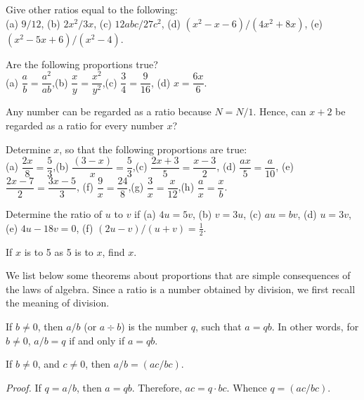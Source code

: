 \documentclass[11pt]{book}
\begin{document}
\begin{exercisecols}
\begin{exlist}
\item Give other ratios equal to the following:\\
      (a) $9/12$, (b) $2x^2/3x$, (c) $12abc/27c^2$, (d) $(x^2-x-6)/(4x^2+8x)$,
      (e) $(x^2-5x+6)/(x^2-4)$.
\item Are the following proportions true?\\
      (a) $\dfrac{a}{b} = \dfrac{a^2}{ab}$,\quad (b) $\dfrac{x}{y} =
      \dfrac{x^2}{y^2}$,\quad (c) $\dfrac{3}{4} = \dfrac{9}{16}$,\quad
      (d) $x = \dfrac{6x}{6}$.
\item Any number can be regarded as a ratio because $N = N/1$. Hence, can $x + 2$
      be regarded as a ratio for every number $x$?
\item Determine $x$, so that the following proportions are true:\\
      (a) $\dfrac{2x}{8} = \dfrac{5}{3}$,\quad (b) $\dfrac{(3-x)}{x} =
      \dfrac{5}{3}$,\quad (c) $\dfrac{2x+3}{5} = \dfrac{x-3}{2}$,\quad
      (d) $\dfrac{ax}{5} = \dfrac{a}{10}$,\quad
      \stex(e) $\dfrac{2x-7}{2} = \dfrac{3x-5}{3}$,\quad
      (f) $\dfrac{9}{x} = \dfrac{24}{8}$,\quad (g) $\dfrac{3}{x} =
      \dfrac{x}{12}$,\quad (h) $\dfrac{a}{x} = \dfrac{x}{b}$.
\item Determine the ratio of $u$ to $v$ if (a) $4u = 5v$, (b) $v = 3u$,
      (c) $au = bv$, (d) $u = 3v$, (e) $4u - 18v = 0$,
      (f) $(2u - v)/(u + v) = \frac{1}{2}$.
\item If $x$ is to 5 as 5 is to $x$, find $x$.
\end{exlist}
\end{exercisecols}

We list below some theorems about proportions that are simple consequences of the
laws of algebra. Since a ratio is a number obtained by division, we first recall
the meaning of division.

\begin{definition}
If $b \neq 0$, then $a/b$ (or $a \div b$) is the number $q$, such that $a = qb$.
In other words, for $b \neq 0$, $a/b = q$ if and only if $a = qb$.
\end{definition}

\begin{theorem}
If $b \neq 0$, and $c \neq 0$, then $a/b = (ac/bc)$.
\end{theorem}

\noindent\emph{Proof.} If $q = a/b$, then $a = qb$. Therefore, $ac = q \cdot bc$.
Whence $q = (ac/bc)$.
\end{document}
